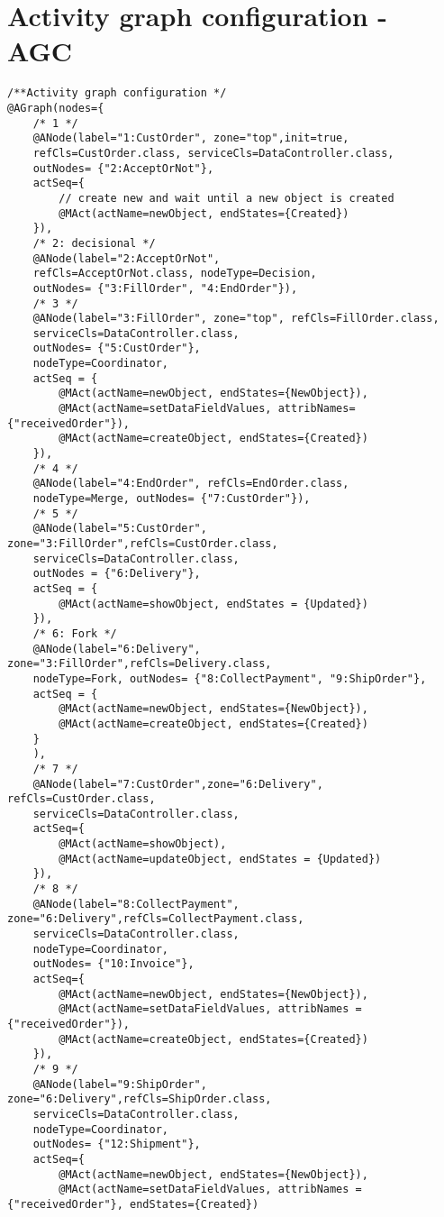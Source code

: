 %
\section{Activity graph configuration - AGC} \label{apex:agl-agc}
%
\begin{verbatim}
/**Activity graph configuration */
@AGraph(nodes={
	/* 1 */    
	@ANode(label="1:CustOrder", zone="top",init=true, 
	refCls=CustOrder.class, serviceCls=DataController.class, 
	outNodes= {"2:AcceptOrNot"},
	actSeq={
		// create new and wait until a new object is created
		@MAct(actName=newObject, endStates={Created})
	}),
	/* 2: decisional */    
	@ANode(label="2:AcceptOrNot", 
	refCls=AcceptOrNot.class, nodeType=Decision, 
	outNodes= {"3:FillOrder", "4:EndOrder"}),
	/* 3 */    
	@ANode(label="3:FillOrder", zone="top", refCls=FillOrder.class,
	serviceCls=DataController.class,
	outNodes= {"5:CustOrder"},
	nodeType=Coordinator,
	actSeq = {
		@MAct(actName=newObject, endStates={NewObject}),
		@MAct(actName=setDataFieldValues, attribNames={"receivedOrder"}),
		@MAct(actName=createObject, endStates={Created})
	}),
	/* 4 */    
	@ANode(label="4:EndOrder", refCls=EndOrder.class, 
	nodeType=Merge, outNodes= {"7:CustOrder"}),
	/* 5 */    
	@ANode(label="5:CustOrder", zone="3:FillOrder",refCls=CustOrder.class,
	serviceCls=DataController.class,
	outNodes = {"6:Delivery"},
	actSeq = {
		@MAct(actName=showObject, endStates = {Updated})
	}),
	/* 6: Fork */    
	@ANode(label="6:Delivery", zone="3:FillOrder",refCls=Delivery.class, 
	nodeType=Fork, outNodes= {"8:CollectPayment", "9:ShipOrder"},
	actSeq = {
		@MAct(actName=newObject, endStates={NewObject}),
		@MAct(actName=createObject, endStates={Created})      
	}
	),
	/* 7 */    
	@ANode(label="7:CustOrder",zone="6:Delivery", refCls=CustOrder.class,
	serviceCls=DataController.class, 
	actSeq={
		@MAct(actName=showObject),
		@MAct(actName=updateObject, endStates = {Updated})
	}),
	/* 8 */    
	@ANode(label="8:CollectPayment", zone="6:Delivery",refCls=CollectPayment.class, 
	serviceCls=DataController.class,
	nodeType=Coordinator,
	outNodes= {"10:Invoice"},
	actSeq={
		@MAct(actName=newObject, endStates={NewObject}),
		@MAct(actName=setDataFieldValues, attribNames = {"receivedOrder"}),
		@MAct(actName=createObject, endStates={Created})
	}),
	/* 9 */    
	@ANode(label="9:ShipOrder", zone="6:Delivery",refCls=ShipOrder.class,
	serviceCls=DataController.class,
	nodeType=Coordinator,
	outNodes= {"12:Shipment"},
	actSeq={
		@MAct(actName=newObject, endStates={NewObject}),
		@MAct(actName=setDataFieldValues, attribNames = {"receivedOrder"}, endStates={Created})

\end{verbatim}
